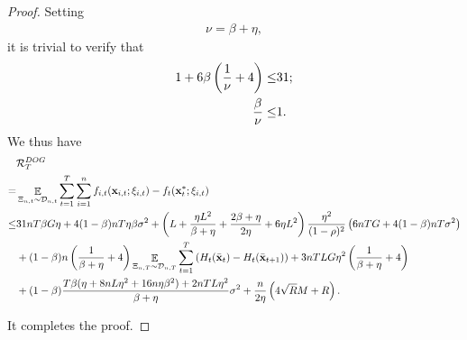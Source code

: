 \documentclass{article}
\begin{document}
\begin{proof}
Setting 
\begin{align}
\nonumber
\nu = \beta + \eta,
\end{align} it is trivial to verify that
\begin{align}
\nonumber
1 + 6\beta\left( \frac{1}{\nu}+4 \right) \le & 31; \\ \nonumber
\frac{\beta}{\nu} \le & 1.
\end{align} We thus have 
\begin{align}
\nonumber
& {\mathcal{R}}_T^{DOG} \\ \nonumber 
= & \mathop{\mathbb{E}}_{ \Xi_{n,t} \sim \mathcal{D}_{n,t} } \sum_{t=1}^T\sum_{i=1}^n f_{i,t}({\bf x}_{i,t};\xi_{i,t}) - f_t({\bf x}_t^\ast;\xi_{i,t}) \\ \nonumber
\le & 31 nT\beta G \eta + 4(1-\beta)nT\eta \beta\sigma^2 + \left(  L +  \frac{\eta L^2}{\beta + \eta} + \frac{2\beta + \eta}{2\eta} + 6\eta L^2  \right) \frac{\eta^2}{(1-\rho)^2}   \left(  6nTG + 4(1-\beta)nT \sigma^2  \right) \\ \nonumber 
&+ (1-\beta)n \left( \frac{1}{\beta + \eta} + 4 \right) \mathop{\mathbb{E}}_{ \Xi_{n,T} \sim \mathcal{D}_{n,T} }\sum_{t=1}^T \left( H_t(\bar{{\bf x}}_t) - H_t(\bar{{\bf x}}_{t+1}) \right) + 3nTLG\eta^2\left(  \frac{1}{\beta + \eta} + 4  \right) \\ \nonumber 
& + (1-\beta) \frac{T\beta(\eta + 8nL\eta^2 + 16n\eta\beta^2) + 2nTL\eta^2}{\beta + \eta }  \sigma^2  + \frac{n}{2\eta}\left(  4\sqrt{R}M + R   \right).
\end{align} 

It completes the proof.



\end{proof}
\end{document}
